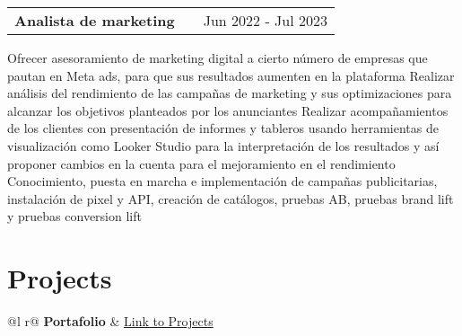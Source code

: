 \documentclass[a4paper,12pt]{article}
\makeatletter
\newenvironment{jobshort}[2]
    {
    \begin{tabularx}{\linewidth}{@{}l X r@{}}
    \textbf{#1} & \hfill &  #2 \\[3.75pt]
    \end{tabularx}
    }
    {
    }
\makeatother
\begin{document}
\begin{jobshort}{Analista de marketing}{Jun 2022 - Jul 2023}
Ofrecer asesoramiento de marketing digital a cierto número de empresas que pautan en Meta ads, para que sus resultados aumenten en la plataforma
Realizar análisis del rendimiento de las campañas de marketing y sus optimizaciones para alcanzar los objetivos planteados por los anunciantes
Realizar acompañamientos de los clientes con presentación de informes y tableros usando herramientas de visualización como Looker Studio para la interpretación de los resultados y así proponer cambios en la cuenta para el mejoramiento en el rendimiento
Conocimiento, puesta en marcha e implementación de campañas publicitarias, instalación de pixel y API, creación de catálogos, pruebas AB, pruebas brand lift y pruebas conversion lift
\end{jobshort}
  


\section{Projects}

\begin{tabularx}{\linewidth}{ @{}l r@{} }
\textbf{Portafolio} & \hfill \href{https://nimble-forsythia-2a8.notion.site/Portafolio-27cc704eaffb4237a7eac2aab9c71378}{Link to Projects} \\[3.75pt]
  \\
\end{tabularx}

\end{document}
